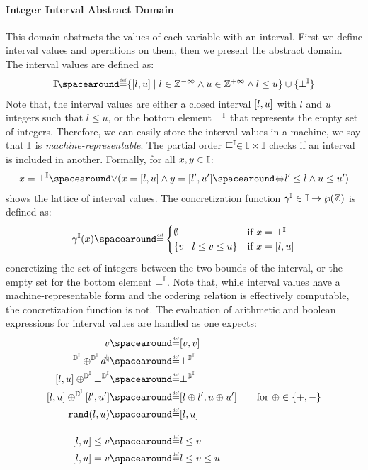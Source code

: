 \paragraph{Integer Interval Abstract Domain}
This domain abstracts the values of each variable with an interval.
First we define interval values and operations on them, then we present the abstract domain. The interval values are defined as:
  \begin{align*}
    \intervaltype \DefeQ \setdef{\interval{l}{u}}{l \in \Zminus \land u \in \Zplus \land l \le u} \setjoin \{\intervalbottom\}
  \end{align*}
Note that, the interval values are either a closed interval $[l, u]$ with $l$ and $u$ integers such that $l \le u$, or the bottom element $\bot^{\mathbb{I}}$ that represents the empty set of integers. Therefore, we can easily store the interval values in a machine, we say that $\mathbb{I}$ is \emph{machine-representable}.
The partial order $\sqsubseteq^{\mathbb{I}}\in\mathbb{I}\times\mathbb{I}$ checks if an interval is included in another. Formally, for all $x, y \in \mathbb{I}$:
  \begin{align*}
    x = \intervalbottom \LoR (x = \interval{l}{u} \land y = \interval{l'}{u'} \IfF l' \le l \land u \le u')
  \end{align*}
   shows the lattice of interval values.
  The concretization function $\gamma^{\mathbb{I}}\in\mathbb{I}\to\wp(\mathbb{Z})$ is defined as:
  \begin{align*}
    \intervalconcretization(x) \DefeQ \begin{cases}
      \emptyset & \text{if } x = \intervalbottom \\
      \setdef{v}{l \le v \le u} & \text{if } x = \interval{l}{u}
    \end{cases}
  \end{align*}
  concretizing the set of integers between the two bounds of the interval, or the empty set for the bottom element $\bot^{\mathbb{I}}$.
  Note that, while interval values have a machine-representable form and the ordering relation is effectively computable, the concretization function is not.
%
  The evaluation of arithmetic and boolean expressions for interval values are handled as one expects:
  \begin{align*}
    \defvalue &\DefeQ \interval{\defvalue}{\defvalue} \\
    \intervalabstractdomainbottom \oplus^{\intervalabstractdomaintype} \defabstractvalue &\DefeQ \intervalabstractdomainbottom \\
    \interval{l}{u} \oplus^{\intervalabstractdomaintype} \intervalabstractdomainbottom &\DefeQ \intervalabstractdomainbottom \\
    \interval{l}{u} \oplus^{\intervalabstractdomaintype} \interval{l'}{u'} &\DefeQ
    \interval{l \oplus l'}{u \oplus u'} \tag*{for $\oplus\in\{+, -\}$} \\
    \randval(l, u) &\DefeQ \interval{l}{u} \\[1em]
    \interval{l}{u} \le \defvalue &\DefeQ l \le \defvalue \\
    \interval{l}{u} = \defvalue &\DefeQ l \le \defvalue \le u\\
  \end{align*}
